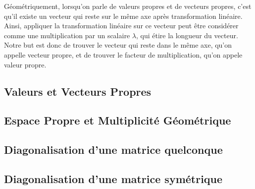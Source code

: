 \documentclass{article}
\begin{document}
Géométriquement, lorsqu'on parle de valeurs propres et de vecteurs propres, c'est
qu'il existe un vecteur qui reste sur le même axe après transformation linéaire.
Ainsi, appliquer la transformation linéaire sur ce vecteur peut être considérer
comme une multiplication par un scalaire $\lambda$, qui étire la longueur du vecteur.
Notre but est donc de trouver le vecteur qui reste dans le même axe, qu'on appelle
vecteur propre, et de trouver le facteur de multiplication, qu'on appele valeur
propre.

\subsection{Valeurs et Vecteurs Propres}

\subsection{Espace Propre et Multiplicité Géométrique}

\subsection{Diagonalisation d'une matrice quelconque}

\subsection{Diagonalisation d'une matrice symétrique}

\pagebreak
\end{document}
